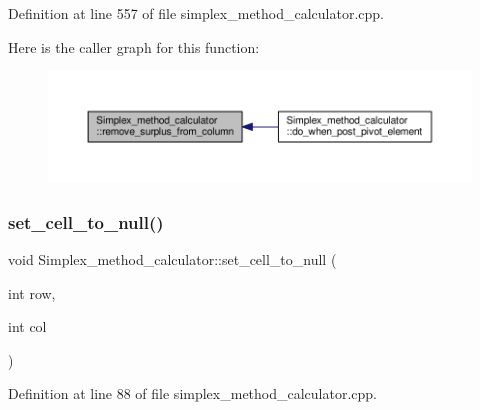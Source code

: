 Definition at line 557 of file simplex\+\_\+method\+\_\+calculator.\+cpp.

Here is the caller graph for this function\+:\nopagebreak
\begin{figure}[H]
\begin{center}
\leavevmode
\includegraphics[width=350pt]{classSimplex__method__calculator_ab5bb8261a97db63956fad14a0c1f0f05_icgraph}
\end{center}
\end{figure}
\mbox{\label{classSimplex__method__calculator_afcff0009b07937efe20f3d64ea10d550}} 
\subsubsection{\texorpdfstring{set\+\_\+cell\+\_\+to\+\_\+null()}{set\_cell\_to\_null()}}
{\footnotesize\ttfamily void Simplex\+\_\+method\+\_\+calculator\+::set\+\_\+cell\+\_\+to\+\_\+null (\begin{DoxyParamCaption}\item[{int}]{row,  }\item[{int}]{col }\end{DoxyParamCaption})\hspace{0.3cm}{\ttfamily [private]}}



Definition at line 88 of file simplex\+\_\+method\+\_\+calculator.\+cpp.

